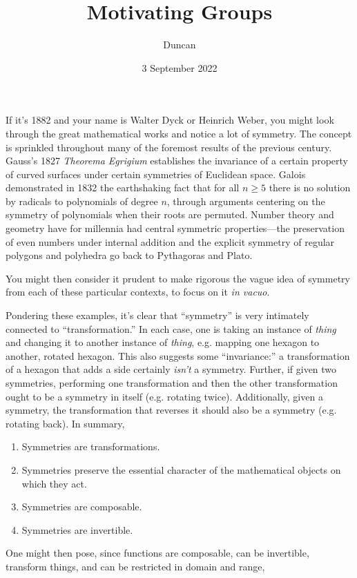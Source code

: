 \documentclass{article}
\title{Motivating Groups}
\author{Duncan}
\date{3 September 2022}
\begin{document}
\maketitle

If it's 1882 and your name is Walter Dyck or Heinrich Weber, you might look through the great mathematical works and notice a lot of symmetry.
The concept is sprinkled throughout many of the foremost results of the previous century.
Gauss's 1827 \textit{Theorema Egrigium} establishes the invariance of a certain property of curved surfaces under certain symmetries of Euclidean space.
Galois demonstrated in 1832 the earthshaking fact that for all $n\geq 5$ there is no solution by radicals to polynomials of degree $n$,
through arguments centering on the symmetry of polynomials when their roots are permuted.
Number theory and geometry have for millennia had central symmetric properties---the preservation of even numbers under internal addition
and the explicit symmetry of regular polygons and polyhedra go back to Pythagoras and Plato.

You might then consider it prudent to make rigorous the vague idea of symmetry from each of these particular contexts, to focus on it \textit{in vacuo}.

Pondering these examples, it's clear that ``symmetry'' is very intimately connected to ``transformation.''
In each case, one is taking an instance of \textit{thing} and changing it to another instance of \textit{thing},
e.g. mapping one hexagon to another, rotated hexagon.
This also suggests some ``invariance:'' a transformation of a hexagon that adds a side certainly \textit{isn't} a symmetry.
Further, if given two symmetries, performing one transformation and then the other transformation ought to be a symmetry in itself (e.g. rotating twice).
Additionally, given a symmetry, the transformation that reverses it should also be a symmetry (e.g. rotating back).
In summary,

\begin{enumerate}
\item Symmetries are transformations.
\item Symmetries preserve the essential character of the mathematical objects on which they act.
\item Symmetries are composable.
\item Symmetries are invertible.
\end{enumerate}
One might then pose, since functions are composable, can be invertible, transform things, and can be restricted in domain and range,
\end{document}
